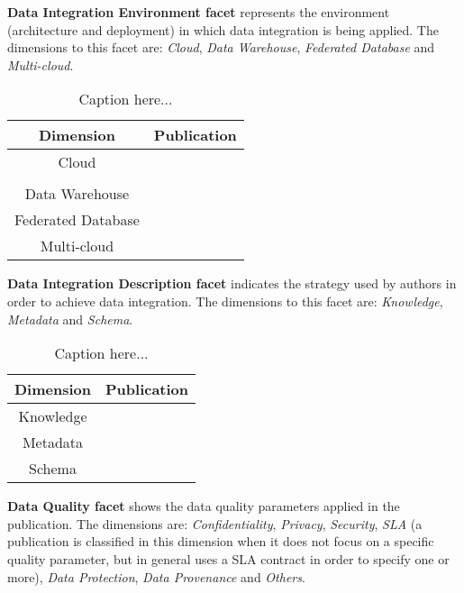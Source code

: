 \begin{description}
\item \textbf{Data Integration Environment facet} represents the environment (architecture and deployment) in which data integration is being applied. The dimensions to this facet are: \textit{Cloud}, \textit{Data Warehouse}, \textit{Federated Database} and \textit{Multi-cloud}.
\begin{table}[h]
\caption{Caption here...}
\begin{center}
\begin{tabular}{|c|c|}
\hline 
\textbf{Dimension} & \textbf{Publication} \\ 
\hline 
Cloud & \cite{068,070,072,073,074,075,076,077,078,079,081,082,083,085} \\ 
      & \cite{087,088,089,090,094,095,096,097,098,099,100,102,103,105,106,107,108,109,110,113}\\ 
\hline 
Data Warehouse & \cite{066,091,114} \\ 
\hline 
Federated Database & \cite{071,089,112} \\ 
\hline 
Multi-cloud & \cite{012,071,093} \\ 
\hline 
\end{tabular}
\end{center}
\end{table}
\item \textbf{Data Integration Description facet} indicates the strategy used by authors in order to achieve data integration. The dimensions to this facet are: \textit{Knowledge}, \textit{Metadata} and \textit{Schema}.
\begin{table}[h]
\caption{Caption here...}
\begin{center}
\begin{tabular}{|c|c|}
\hline 
\textbf{Dimension} & \textbf{Publication} \\ 
\hline 
Knowledge & \cite{012,083} \\ 
\hline 
Metadata & \cite{066,108,113} \\ 
\hline 
Schema & \citep{070,071,072,073,075,083,089,091,102,112,114} \\ 
\hline 
\end{tabular}
\end{center}
\end{table}
\item \textbf{Data Quality facet} shows the data quality parameters applied in the publication. The dimensions are: \textit{Confidentiality}, \textit{Privacy}, \textit{Security}, \textit{SLA} (a publication is classified in this dimension when it does not focus on a specific quality parameter, but in general uses a SLA contract in order to specify one or more), \textit{Data Protection}, \textit{Data Provenance} and \textit{Others}.

\end{description}
